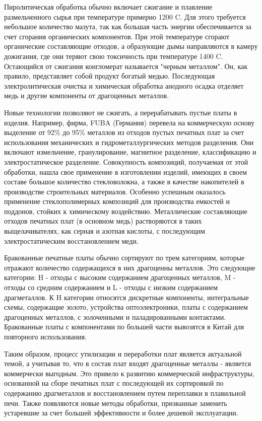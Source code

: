 Пиролитическая обработка обычно включает сжигание и плавление размельченного сырья при температуре примерно 1200 \textdegree C. Для этого требуется небольшое количество мазута, так как большая часть энергии обеспечивается за счет сгорания органических компонентов. При этой температуре сгорают органические составляющие отходов, а образующие дымы направляются в камеру дожигания, где они теряют свою токсичность при температуре 1400 \textdegree C. Остающийся от сжигания конгломерат называется "черным металлом". Он, как правило, представляет собой продукт богатый медью. Последующая электролитическая очистка и химическая обработка анодного осадка отделяет медь и другие компоненты от драгоценных металлов.

Новые технологии позволяют не сжигать, а перерабатывать пустые платы в изделия. Например, фирма, FUBA (Германия) перевела на коммерческую основу выделение от 92\% до 95\% металлов из отходов пустых печатных плат за счет использования механических и гидрометаллургических методов разделения. Они включают измельчение, гранулирование, магнитное разделение, классификацию и электростатическое разделение. Совокупность композиций, получаемая от этой обработки, нашла свое применение в изготовлении изделий, имеющих в своем составе большое количество стекловолокна, а также в качестве накопителей в производстве строительных материалов. Особенно успешным оказалось применение стеклополимерных композиций для производства емкостей и поддонов, стойких к химическому воздействию. Металлические составляющие отходов печатных плат (в основном медь) растворяются в таких выщелачивателях, как серная и азотная кислоты, с последующим электростатическим восстановлением меди.

Бракованные печатные платы обычно сортируют по трем категориям, которые отражают количество содержащихся в них драгоценны металлов. Это следующие категории: H - отходы с высоким содержанием драгоценных металлов, M - отходы со средним содержанием и L - отходы с низким содержанием драгметаллов. К H категории относятся дискретные компоненты, интегральные схемы, содержащие золото, устройства оптоэлектроники, платы с содержанием драгоценных металлов, с золоченными и паладированными контактами. Бракованные платы с компонентами по большей части вывозятся в Китай для повторного использования.

Таким образом, процесс утилизации и переработки плат является актуальной темой, а учитывая то, что в состав плат входят драгоценные металлы - является коммерчески выгодным. Это привело к развитию коммерческой инфраструктуры, основанной на сборе печатных плат с последующей их сортировкой по содержанию драгметаллов и восстановлением путем переплавки в плавильной печи. Также появляются новые методы обработки, призванные заменить устаревшие за счет большей эффективности и более дешевой эксплуатации.
